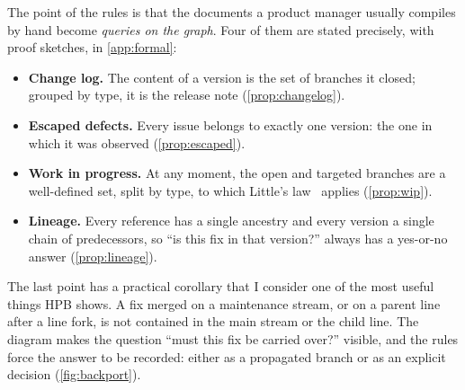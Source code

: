The point of the rules is that the documents a product manager usually
compiles by hand become \emph{queries on the graph}. Four of them are
stated precisely, with proof sketches, in \cref{app:formal}:
\begin{itemize}[leftmargin=1.5em,itemsep=1pt,topsep=2pt]
  \item \textbf{Change log.} The content of a version is the set of
        branches it closed; grouped by type, it is the release note
        (\cref{prop:changelog}).
  \item \textbf{Escaped defects.} Every issue belongs to exactly one
        version: the one in which it was observed (\cref{prop:escaped}).
  \item \textbf{Work in progress.} At any moment, the open and targeted
        branches are a well-defined set, split by type, to which Little's
        law~\citep{little1961} applies (\cref{prop:wip}).
  \item \textbf{Lineage.} Every reference has a single ancestry and every
        version a single chain of predecessors, so ``is this fix in that
        version?'' always has a yes-or-no answer (\cref{prop:lineage}).
\end{itemize}
The last point has a practical corollary that I consider one of the most
useful things HPB shows. A fix merged on a maintenance stream, or on a
parent line after a line fork, is not contained in the main stream or the
child line. The diagram makes the question ``must this fix be carried
over?'' visible, and the rules force the answer to be recorded: either as
a propagated branch or as an explicit decision (\cref{fig:backport}).
